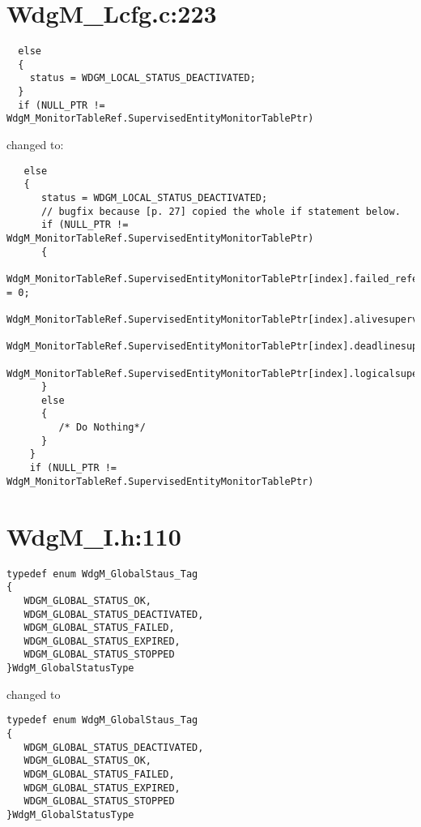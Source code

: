 \documentclass[11pt,a4paper]{article}
\begin{document}
\newpage
\section{WdgM\_Lcfg.c:223}
\begin{lstlisting}
  else
  {
    status = WDGM_LOCAL_STATUS_DEACTIVATED;
  }
  if (NULL_PTR != WdgM_MonitorTableRef.SupervisedEntityMonitorTablePtr)
\end{lstlisting}
changed to:
\begin{lstlisting}
   else
   {
      status = WDGM_LOCAL_STATUS_DEACTIVATED;
      // bugfix because [p. 27] copied the whole if statement below.
      if (NULL_PTR != WdgM_MonitorTableRef.SupervisedEntityMonitorTablePtr)
      {
         WdgM_MonitorTableRef.SupervisedEntityMonitorTablePtr[index].failed_reference_supervisioncycles = 0;
         WdgM_MonitorTableRef.SupervisedEntityMonitorTablePtr[index].alivesupervision_result=WDGM_CORRECT;
         WdgM_MonitorTableRef.SupervisedEntityMonitorTablePtr[index].deadlinesupervision_result=WDGM_CORRECT;
         WdgM_MonitorTableRef.SupervisedEntityMonitorTablePtr[index].logicalsupervision_result=WDGM_CORRECT;
      }
      else
      {
         /* Do Nothing*/
      }
    }
    if (NULL_PTR != WdgM_MonitorTableRef.SupervisedEntityMonitorTablePtr)
\end{lstlisting}

\newpage
\section{WdgM\_I.h:110}
\begin{lstlisting}
typedef enum WdgM_GlobalStaus_Tag
{
   WDGM_GLOBAL_STATUS_OK,
   WDGM_GLOBAL_STATUS_DEACTIVATED,
   WDGM_GLOBAL_STATUS_FAILED,
   WDGM_GLOBAL_STATUS_EXPIRED,
   WDGM_GLOBAL_STATUS_STOPPED
}WdgM_GlobalStatusType
\end{lstlisting}
changed to
\begin{lstlisting}
typedef enum WdgM_GlobalStaus_Tag
{
   WDGM_GLOBAL_STATUS_DEACTIVATED,
   WDGM_GLOBAL_STATUS_OK,
   WDGM_GLOBAL_STATUS_FAILED,
   WDGM_GLOBAL_STATUS_EXPIRED,
   WDGM_GLOBAL_STATUS_STOPPED
}WdgM_GlobalStatusType
\end{lstlisting}
\end{document}
